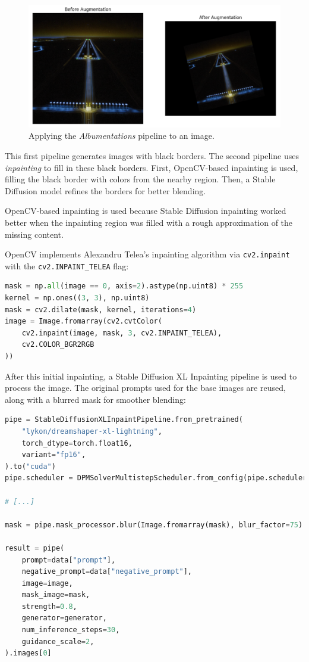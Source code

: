 \begin{figure}[htbp]
\centering
\includegraphics[width=1.0\textwidth]{figures/albumentations.png}
  \caption{Applying the \emph{Albumentations} pipeline to an image.}
\end{figure}

This first pipeline generates images with black borders. 
The second pipeline uses \emph{inpainting} to fill in these black borders. 
First, OpenCV-based inpainting is used, filling the black border with colors from the nearby region. 
Then, a Stable Diffusion model refines the borders for better blending.

OpenCV-based inpainting is used because Stable Diffusion inpainting worked
better when the inpainting region was filled with a rough approximation of the
missing content.

OpenCV implements Alexandru Telea's inpainting algorithm \cite{telea_image_2004}
via \texttt{cv2.inpaint} with the \texttt{cv2.INPAINT\_TELEA} flag:

\begin{lstlisting}[language=Python, caption={Variant image generation module,
OpenCV-based inpainting}]
mask = np.all(image == 0, axis=2).astype(np.uint8) * 255
kernel = np.ones((3, 3), np.uint8)
mask = cv2.dilate(mask, kernel, iterations=4)
image = Image.fromarray(cv2.cvtColor(
    cv2.inpaint(image, mask, 3, cv2.INPAINT_TELEA),
    cv2.COLOR_BGR2RGB
))
\end{lstlisting}

After this initial inpainting, a Stable Diffusion XL Inpainting pipeline is used to process the image. 
The original prompts used for the base images are reused, along with a blurred mask for smoother blending:

\begin{lstlisting}[language=Python, caption={Variant image generation module,
Stable Diffusion XL Inpainting pipeline}]
pipe = StableDiffusionXLInpaintPipeline.from_pretrained(
    "lykon/dreamshaper-xl-lightning",
    torch_dtype=torch.float16,
    variant="fp16",
).to("cuda")
pipe.scheduler = DPMSolverMultistepScheduler.from_config(pipe.scheduler.config)

# [...]

mask = pipe.mask_processor.blur(Image.fromarray(mask), blur_factor=75)

result = pipe(
    prompt=data["prompt"],
    negative_prompt=data["negative_prompt"],
    image=image,
    mask_image=mask,
    strength=0.8,
    generator=generator,
    num_inference_steps=30,
    guidance_scale=2,
).images[0]
\end{lstlisting}


